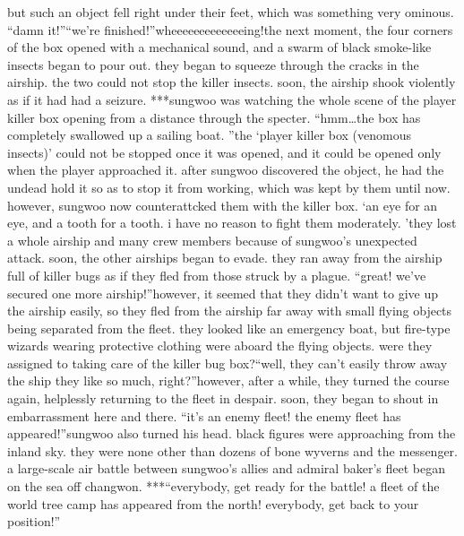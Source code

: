 but such an object fell right under their feet, which was something very ominous.
“damn it!”“we’re finished!”wheeeeeeeeeeeeeing!the next moment, the four corners of the box opened with a mechanical sound, and a swarm of black smoke-like insects began to pour out.
 they began to squeeze through the cracks in the airship.
 the two could not stop the killer insects.
soon, the airship shook violently as if it had had a seizure.
***sungwoo was watching the whole scene of the player killer box opening from a distance through the specter.
“hmm…the box has completely swallowed up a sailing boat.
”the ‘player killer box (venomous insects)’ could not be stopped once it was opened, and it could be opened only when the player approached it.
after sungwoo discovered the object, he had the undead hold it so as to stop it from working, which was kept by them until now.
however, sungwoo now counterattcked them with the killer box.
‘an eye for an eye, and a tooth for a tooth.
 i have no reason to fight them moderately.
’they lost a whole airship and many crew members because of sungwoo’s unexpected attack.
soon, the other airships began to evade.
 they ran away from the airship full of killer bugs as if they fled from those struck by a plague.
“great! we’ve secured one more airship!”however, it seemed that they didn’t want to give up the airship easily, so they fled from the airship far away with small flying objects being separated from the fleet.
 they looked like an emergency boat, but fire-type wizards wearing protective clothing were aboard the flying objects.
 were they assigned to taking care of the killer bug box?“well, they can’t easily throw away the ship they like so much, right?”however, after a while, they turned the course again, helplessly returning to the fleet in despair.
soon, they began to shout in embarrassment here and there.
“it’s an enemy fleet! the enemy fleet has appeared!”sungwoo also turned his head.
 black figures were approaching from the inland sky.
 they were none other than dozens of bone wyverns and the messenger.
a large-scale air battle between sungwoo’s allies and admiral baker’s fleet began on the sea off changwon.
***“everybody, get ready for the battle! a fleet of the world tree camp has appeared from the north! everybody, get back to your position!”

